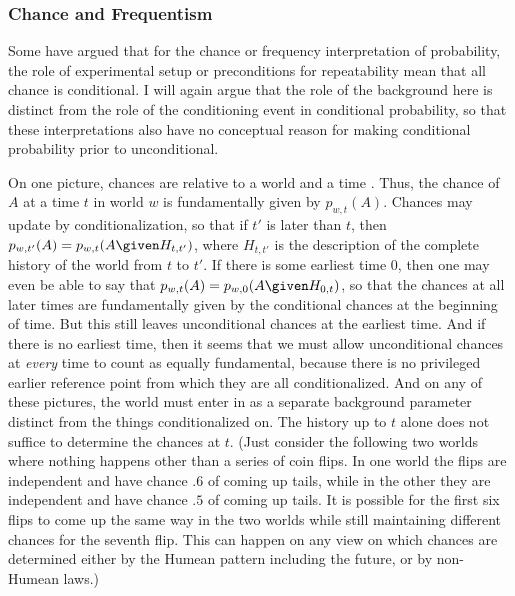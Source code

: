 \subsubsection{Chance and Frequentism}

Some have argued that for the chance or frequency interpretation of probability, the role of experimental setup or preconditions for repeatability mean that all chance is conditional. I will again argue that the role of the background here is distinct from the role of the conditioning event in conditional probability, so that these interpretations also have no conceptual reason for making conditional probability prior to unconditional.

On one picture, chances are relative to a world and a time \citep{objchance}. Thus, the chance of $A$ at a time $t$ in world $w$ is fundamentally given by $p_{w,t}(A)$. Chances may update by conditionalization, so that if $t'$ is later than $t$, then $p_{w,t'}(A)=p_{w,t}(A \given H_{t,t'})$, where $H_{t,t'}$ is the description of the complete history of the world from $t$ to $t'$. If there is some earliest time $0$, then one may even be able to say that $p_{w,t}(A)=p_{w,0}(A \given H_{0,t})$, so that the chances at all later times are fundamentally given by the conditional chances at the beginning of time. But this still leaves unconditional chances at the earliest time. And if there is no earliest time, then it seems that we must allow unconditional chances at \emph{every} time to count as equally fundamental, because there is no privileged earlier reference point from which they are all conditionalized. And on any of these pictures, the world must enter in as a separate background parameter distinct from the things conditionalized on. The history up to $t$ alone does not suffice to determine the chances at $t$. (Just consider the following two worlds where nothing happens other than a series of coin flips. In one world the flips are independent and have chance $.6$ of coming up tails, while in the other they are independent and have chance $.5$ of coming up tails. It is possible for the first six flips to come up the same way in the two worlds while still maintaining different chances for the seventh flip. This can happen on any view on which chances are determined either by the Humean pattern including the future, or by non-Humean laws.)

